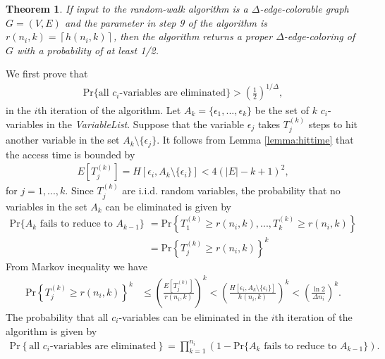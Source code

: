 \documentclass[11pt]{article}
\newtheorem{theorem}{Theorem}[section]
\newenvironment{proof}[1][Proof]{\begin{trivlist}
\item[\hskip \labelsep {\bfseries #1}]}{\end{trivlist}}
\begin{document}
\begin{theorem} 
If input to the random-walk algorithm is a $\Delta$-edge-colorable graph $G=(V,E)$ and the parameter in step 9 of the algorithm is $r(n_i,k)=\left\lceil h(n_i,k) \right\rceil $, then the algorithm returns a proper $\Delta$-edge-coloring of $G$ with a probability of at least 1/2. 
\end{theorem}
\begin{proof}
We first prove that 
\begin{align}
   \mbox{Pr} \{ \mbox{all } c_i \mbox{-variables are eliminated} \} > {\left(\frac{1}{2}\right)}^{1/\Delta},  
	\end{align}
in the $i$th iteration of the algorithm. Let $A_k=\{\epsilon_1,...,\epsilon_k\}$ be the set of $k$ $c_i$-variables in the {\it VariableList}. Suppose that the variable $\epsilon_j$ takes $T_j^{(k)}$ steps to hit another variable in the set $A_k \setminus \{\epsilon_j\}$. It follows from Lemma \ref{lemma:hittime} that the access time is bounded by
\begin{align}
\label{eq:ET}
  E\left[ T_{j}^{(k)}  \right]= H \left[ \epsilon_i, A_k\setminus \{\epsilon_i\}  \right] < 4(|E|-k+1)^2,
\end{align}
for $j=1,...,k$. Since $T_j^{(k) }$ are i.i.d. random variables, the probability that no variables in the set $A_k$ can be eliminated is given by
\begin{align}
\label{eq:Akfails}
   \mbox{Pr} \{ A_k \mbox{ fails to reduce to } A_{k-1} \} &=\mbox{Pr} \left\{ T_{1}^{(k)} \geq r(n_i,k),..., T_{k}^{(k)}\geq r(n_i,k) \right\} \nonumber  \\
	&= \mbox{Pr}\left\{ T_{j}^{(k)} \geq r(n_i,k)\right\}^k
\end{align} 
From Markov inequality we have
\begin{align}
\label{eq:makoveieq}
\mbox{Pr}\left\{ T_{j}^{(k)} \geq r(n_i,k) \right\}^k &\leq \left( \frac{E\left[ T_{j}^{(k)} \right]}{r(n_i,k)}\right) ^k  < \left(\frac{ H \left[ \epsilon_i, A_k\setminus \{\epsilon_i\}  \right]}{h(n_i,k)}  \right) ^k < \left(  \frac{\ln{2}}{\Delta n_i} \right)^k.
\end{align}
The probability that all $c_i$-variables can be eliminated in the $i$th iteration of the algorithm is given by
\begin{align}
\label{eq:allelimiated}
\mbox{Pr}\left\{ \mbox{all } c_i \mbox{-variables are eliminated} \right\} =  \prod_{k=1}^{n_i} (1- \mbox{Pr} \{ A_k \mbox{ fails to reduce to } A_{k-1} \}).
\end{align}

\end{proof}
\end{document}
